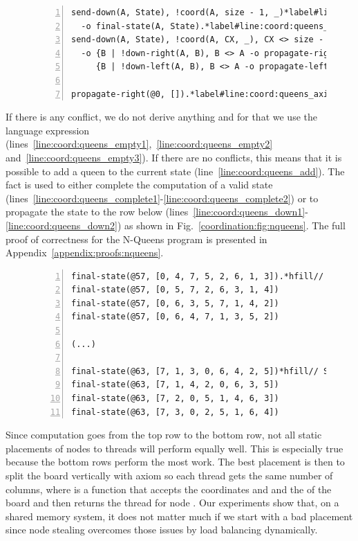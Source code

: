 \begin{figure}[h!]
\begin{Verbatim}[numbers=left,fontsize=\scriptsize,commandchars=\*\#\&]
send-down(A, State), !coord(A, size - 1, _)*label#line:coord:queens_complete1&*hfill// Rule 13: final state
  -o final-state(A, State).*label#line:coord:queens_complete2&
send-down(A, State), !coord(A, CX, _), CX <> size - 1*label#line:coord:queens_down1&*hfill// Rule 14: propagate the state down
  -o {B | !down-right(A, B), B <> A -o propagate-right(B, State)},
     {B | !down-left(A, B), B <> A -o propagate-left(B, State)}.*label#line:coord:queens_down2&

propagate-right(@0, []).*label#line:coord:queens_axiom&*hfill// Initial fact
\end{Verbatim}
  \label{code:coordination:nqueens}
\end{figure}

If there is any conflict, we do not derive anything and for that we use the
language expression 
(lines~\ref{line:coord:queens_empty1},~\ref{line:coord:queens_empty2}
and~\ref{line:coord:queens_empty3}). If there are no conflicts, this means that
it is possible to add a queen to the current state
(line~\ref{line:coord:queens_add}). The fact  is used to either
complete the computation of a valid state
(lines~\ref{line:coord:queens_complete1}-\ref{line:coord:queens_complete2}) or
to propagate the state to the row below
(lines~\ref{line:coord:queens_down1}-\ref{line:coord:queens_down2}) as shown in
Fig.~\ref{coordination:fig:nqueens}.
The full proof of correctness for
the N-Queens program is presented in Appendix~\ref{appendix:proofs:nqueens}.

\begin{figure}[h!]
\begin{Verbatim}[numbers=left,fontsize=\codesize,commandchars=\*\#\&]
final-state(@57, [0, 4, 7, 5, 2, 6, 1, 3]).*hfill// States at square (7, 0)
final-state(@57, [0, 5, 7, 2, 6, 3, 1, 4])
final-state(@57, [0, 6, 3, 5, 7, 1, 4, 2])
final-state(@57, [0, 6, 4, 7, 1, 3, 5, 2])

(...)

final-state(@63, [7, 1, 3, 0, 6, 4, 2, 5])*hfill// States at square (7, 7)
final-state(@63, [7, 1, 4, 2, 0, 6, 3, 5])
final-state(@63, [7, 2, 0, 5, 1, 4, 6, 3])
final-state(@63, [7, 3, 0, 2, 5, 1, 6, 4])
\end{Verbatim}
  \label{code:coordination:8queens}
\end{figure}

Since computation goes from the top row to the bottom row, not all static
placements of nodes to threads will perform equally well. This is especially
true because the bottom rows perform the most work.  The best placement is then
to split the board vertically with axiom  so each thread gets the same number of columns, where
 is a function that accepts the coordinates  and 
and the  of the board and then returns the thread for node .
Our experiments show that, on a shared memory system, it does not matter much if
we start with a bad placement since node stealing overcomes those issues by load
balancing dynamically.

